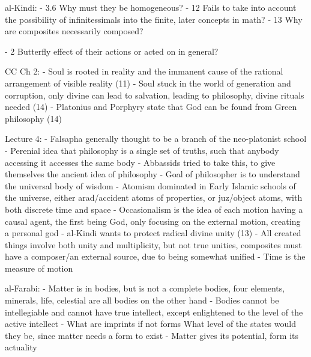 \documentclass[11 pt, twoside]{article}
\begin{document}
al-Kindi:
- 3.6 Why must they be homogeneous?
- 12 Fails to take into account the possibility of infinitessimals into the finite, later concepts in math?
- 13 Why are composites necessarily composed?

- 2 Butterfly effect of their actions or acted on in general?

CC Ch 2:
- Soul is rooted in reality and the immanent cause of the rational arrangement of visible reality (11)
	- Soul stuck in the world of generation and corruption, only divine can lead to salvation, leading to philosophy, divine rituals needed (14)
- Platonius and Porphyry state that God can be found from Green philosophy (14)

Lecture 4:
- Falsapha generally thought to be a branch of the neo-platonist school
- Perenial idea that philosophy is a single set of truths, such that anybody accessing it accesses the same body
	- Abbassids tried to take this, to give themselves the ancient idea of philosophy
	- Goal of philosopher is to understand the universal body of wisdom
- Atomism dominated in Early Islamic schools of the universe, either arad/accident atoms of properties, or juz/object atoms, with both discrete time and space
	- Occasionalism is the idea of each motion having a causal agent, the first being God, only focusing on the external motion, creating a personal god
- al-Kindi wants to protect radical divine unity (13)
	- All created things involve both unity and multiplicity, but not true unities, composites must have a composer/an external source, due to being somewhat unified
- Time is the measure of motion

al-Farabi:
- Matter is in bodies, but is not a complete bodies, four elements, minerals, life, celestial are all bodies on the other hand
- Bodies cannot be intellegiable and cannot have true intellect, except enlightened to the level of the active intellect
- What are imprints if not forms What level of the states would they be, since matter needs a form to exist - Matter gives its potential, form its actuality
\end{document}
